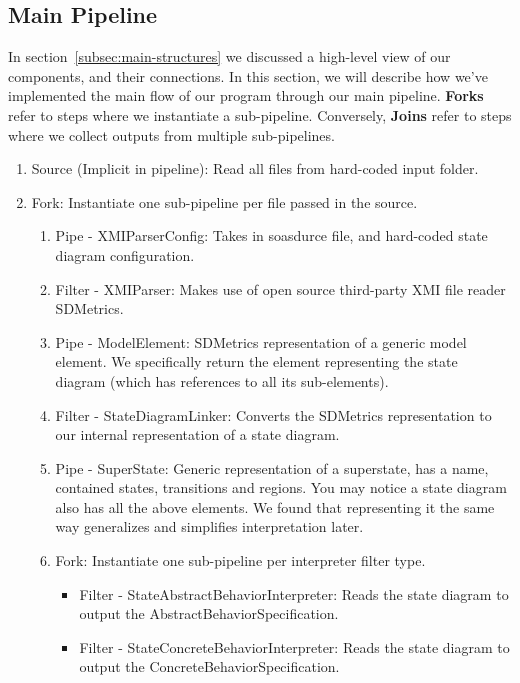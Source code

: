 \documentclass[11pt]{article}
\begin{document}
    \subsection{Main Pipeline}\label{subsec:main-pipeline}
    In section~\ref{subsec:main-structures} we discussed a high-level view of our components, and their connections.
    In this section, we will describe how we've implemented the main flow of our program through our main pipeline.
    \textbf{Forks} refer to steps where we instantiate a sub-pipeline.
    Conversely, \textbf{Joins} refer to steps where we collect outputs from multiple sub-pipelines.

    \begin{enumerate}
        \item Source (Implicit in pipeline): Read all files from hard-coded input folder.
        \item Fork: Instantiate one sub-pipeline per file passed in the source.
        \begin{enumerate}
            \item Pipe - XMIParserConfig: Takes in soasdurce file, and hard-coded state diagram configuration.
            \item Filter - XMIParser: Makes use of open source third-party XMI file reader SDMetrics.
            \item Pipe - ModelElement: SDMetrics representation of a generic model element.
            We specifically return the element representing the state diagram (which has references to all its sub-elements).
            \item Filter - StateDiagramLinker: Converts the SDMetrics representation to our internal representation of a state diagram.
            \item Pipe - SuperState: Generic representation of a superstate, has a name, contained states, transitions and regions.
            You may notice a state diagram also has all the above elements.
            We found that representing it the same way generalizes and simplifies interpretation later.
            \item Fork: Instantiate one sub-pipeline per interpreter filter type.
            \begin{itemize}
                \item Filter - StateAbstractBehaviorInterpreter: Reads the state diagram to output the AbstractBehaviorSpecification.
                \item Filter - StateConcreteBehaviorInterpreter: Reads the state diagram to output the ConcreteBehaviorSpecification.

\end{itemize}
\end{enumerate}
\end{enumerate}
\end{document}
